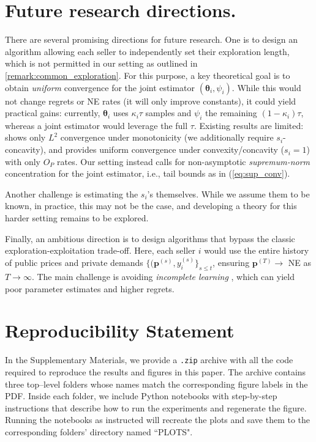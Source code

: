 \documentclass{article} %
\def\eqref#1{equation~\ref{#1}}
\renewcommand{\eqref}[1]{(\ref{#1})}
\begin{document}
\section{Future research directions.}
There are several promising directions for future research. One is to design an algorithm allowing each seller to independently set their exploration length, which is not permitted in our setting as outlined in \cref{remark:common_exploration}.  For this purpose, a key theoretical goal is to obtain \emph{uniform} convergence for the joint estimator $(\boldsymbol{\theta}_i,\psi_i)$. While this would not change regrets or NE rates (it will only improve constants), it could yield practical gains: currently, $\boldsymbol{\theta}_i$ uses $\kappa_i\tau$ samples and $\psi_i$ the remaining $(1-\kappa_i)\tau$, whereas a joint estimator would leverage the full $\tau$. Existing results are limited: \cite{balabdaoui2019least} shows only $L^2$ convergence under monotonicity (we additionally require $s_i$-concavity), and \cite{kuchibhotla2021semiparametric} provides uniform convergence under convexity/concavity ($s_i=1$) with only $O_P$ rates. Our setting instead calls for non-asymptotic \emph{supremum-norm} concentration for the joint estimator, i.e., tail bounds as in \eqref{eq:sup_conv}. 

Another challenge is estimating the $s_i$’s themselves. While we assume them to be known, in practice, this may not be the case, and developing a theory for this harder setting remains to be explored. 

Finally, an ambitious direction is to design algorithms that bypass the classic exploration-exploitation trade-off. Here, each seller $i$ would use the entire history of public prices and private demands $\{(\mathbf{p}^{(s)},y_i^{(s)}\}_{s\leq t}$, ensuring $\mathbf{p}^{(T)} \to$ NE as $T \to \infty$. The main challenge is avoiding \emph{incomplete learning} \citep{keskin2018incomplete}, which can yield poor parameter estimates and higher regrets.  
%


\section*{Reproducibility Statement}
In the Supplementary Materials, we provide a \texttt{.zip} archive with all the code required to reproduce the results and figures in this paper. The archive contains three top–level folders whose names match the corresponding figure labels in the PDF. Inside each folder, we include Python notebooks with step-by-step instructions that describe how to run the experiments and regenerate the figure. Running the notebooks as instructed will recreate the plots and save them to the corresponding folders’ directory named ``PLOTS".
\end{document}
